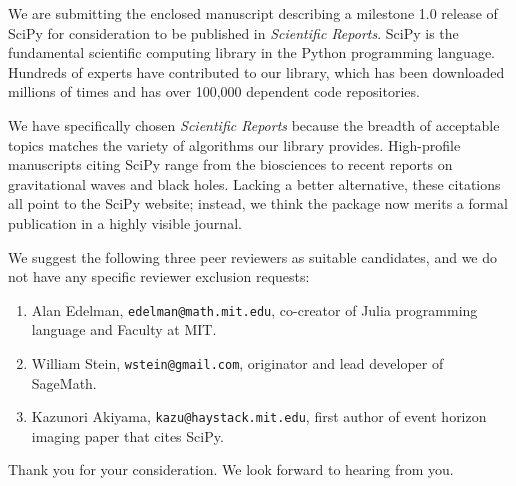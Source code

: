 \documentclass[10pt,stdletter,dateno]{newlfm}
\begin{document}
\begin{newlfm}

We are submitting the enclosed manuscript describing a milestone
1.0 release of SciPy for consideration to be published in
\emph{Scientific Reports}. SciPy is the fundamental scientific
computing library in the Python programming language.
Hundreds of experts have contributed to our library, which
has been downloaded millions of times and has over 100,000 dependent
code repositories.

We have specifically chosen \emph{Scientific Reports} because
the breadth of acceptable topics matches the variety of algorithms
our library provides. High-profile manuscripts citing SciPy range
from the biosciences to recent reports on gravitational waves and
black holes. Lacking a better alternative, these citations all point
to the SciPy website; instead, we think the package now merits a
formal publication in a highly visible journal.

We suggest the following three peer reviewers as suitable candidates,
and we do not have any specific reviewer exclusion requests:

\begin{enumerate}
    \item Alan Edelman, \texttt{edelman@math.mit.edu}, co-creator of Julia
    programming language and Faculty at MIT.
    \item William Stein, \texttt{wstein@gmail.com}, originator and
    lead developer of SageMath.
    \item Kazunori Akiyama, \texttt{kazu@haystack.mit.edu}, first author
    of event horizon imaging paper that cites SciPy.
\end{enumerate}

Thank you for your consideration.  We look forward to
hearing from you.

\end{newlfm}
\end{document}
